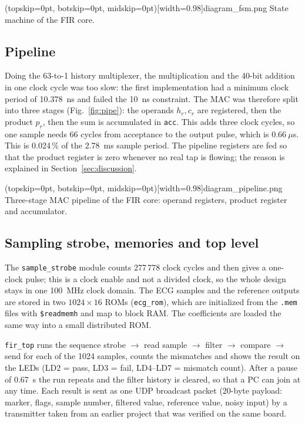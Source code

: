 \documentclass{ieeeaccess}
\begin{document}
\Figure[t!](topskip=0pt, botskip=0pt, midskip=0pt)[width=0.98\columnwidth]{diagram_fsm.png}
{State machine of the FIR core.\label{fig:fsm}}

\subsection{Pipeline}
Doing the 63-to-1 history multiplexer, the multiplication and the 40-bit addition in one clock cycle was too slow: the first implementation had a minimum clock period of 10.378~ns and failed the 10~ns constraint. The MAC was therefore split into three stages (Fig.~\ref{fig:pipe}): the operands $h_r, c_r$ are registered, then the product $p_r$, then the sum is accumulated in \texttt{acc}. This adds three clock cycles, so one sample needs 66 cycles from acceptance to the output pulse, which is $0.66~\mu$s. This is 0.024\,\% of the 2.78~ms sample period. The pipeline registers are fed so that the product register is zero whenever no real tap is flowing; the reason is explained in Section~\ref{sec:discussion}.

\Figure[t!](topskip=0pt, botskip=0pt, midskip=0pt)[width=0.98\columnwidth]{diagram_pipeline.png}
{Three-stage MAC pipeline of the FIR core: operand registers, product register and accumulator.\label{fig:pipe}}

\subsection{Sampling strobe, memories and top level}
The \texttt{sample\_strobe} module counts 277\,778 clock cycles and then gives a one-clock pulse; this is a clock enable and not a divided clock, so the whole design stays in one 100~MHz clock domain. The ECG samples and the reference outputs are stored in two $1024\times16$ ROMs (\texttt{ecg\_rom}), which are initialized from the \texttt{.mem} files with \texttt{\$readmemh} and map to block RAM. The coefficients are loaded the same way into a small distributed ROM.

\texttt{fir\_top} runs the sequence strobe $\rightarrow$ read sample $\rightarrow$ filter $\rightarrow$ compare $\rightarrow$ send for each of the 1024 samples, counts the mismatches and shows the result on the LEDs (LD2 = pass, LD3 = fail, LD4--LD7 = mismatch count). After a pause of 0.67~s the run repeats and the filter history is cleared, so that a PC can join at any time. Each result is sent as one UDP broadcast packet (20-byte payload: marker, flags, sample number, filtered value, reference value, noisy input) by a transmitter taken from an earlier project that was verified on the same board.
\end{document}

